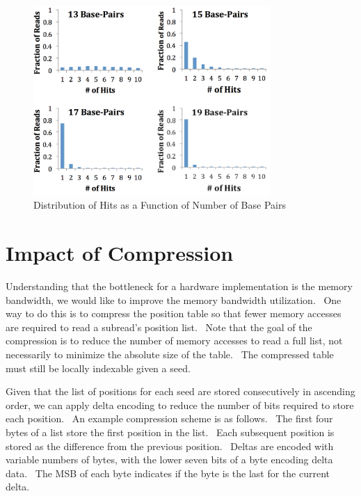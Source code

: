 \documentclass[11pt]{article}
\begin{document}
\begin{figure}[ht!]
\centering
\includegraphics[width=90mm]{readsvhits.png}
\caption{Distribution of Hits as a Function of Number of Base Pairs}
\label{histogram}
\end{figure}


\section{Impact of Compression}
Understanding that the bottleneck for a hardware implementation is the memory bandwidth, we would like to improve the memory bandwidth utilization.  One way to do this is to compress the position table so that fewer memory accesses are required to read a subread’s position list.  Note that the goal of the compression is to reduce the number of memory accesses to read a full list, not necessarily to minimize the absolute size of the table.  The compressed table must still be locally indexable given a seed.

Given that the list of positions for each seed are stored consecutively in ascending order, we can apply delta encoding to reduce the number of bits required to store each position.  An example compression scheme is as follows.  The first four bytes of a list store the first position in the list.  Each subsequent position is stored as the difference from the previous position.  Deltas are encoded with variable numbers of bytes, with the lower seven bits of a byte encoding delta data.  The MSB of each byte indicates if the byte is the last for the current delta.
\end{document}
